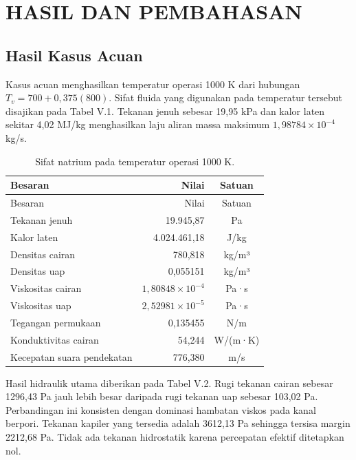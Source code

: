 \documentclass[
  12pt,
  12pt,a4paper,oneside]{report}
\begin{document}
\hypertarget{hasil-dan-pembahasan}{%
\chapter{HASIL DAN PEMBAHASAN}\label{hasil-dan-pembahasan}}

\hypertarget{hasil-kasus-acuan}{%
\section{Hasil Kasus Acuan}\label{hasil-kasus-acuan}}

Kasus acuan menghasilkan temperatur operasi 1000 K dari hubungan
\(T_v=700+0{,}375(800)\). Sifat fluida yang digunakan pada temperatur
tersebut disajikan pada Tabel V.1. Tekanan jenuh sebesar 19,95 kPa dan
kalor laten sekitar 4,02 MJ/kg menghasilkan laju aliran massa maksimum
\(1{,}98784\times10^{-4}\) kg/s.

\begin{longtable}[]{@{}lrc@{}}
\caption{Sifat natrium pada temperatur operasi 1000 K.}\tabularnewline
\toprule
Besaran & Nilai & Satuan \\
\midrule
\endfirsthead
\toprule
Besaran & Nilai & Satuan \\
\midrule
\endhead
Tekanan jenuh & 19.945,87 & Pa \\
Kalor laten & 4.024.461,18 & J/kg \\
Densitas cairan & 780,818 & kg/m³ \\
Densitas uap & 0,055151 & kg/m³ \\
Viskositas cairan & \(1{,}80848\times10^{-4}\) & Pa·s \\
Viskositas uap & \(2{,}52981\times10^{-5}\) & Pa·s \\
Tegangan permukaan & 0,135455 & N/m \\
Konduktivitas cairan & 54,244 & W/(m·K) \\
Kecepatan suara pendekatan & 776,380 & m/s \\
\bottomrule
\end{longtable}

Hasil hidraulik utama diberikan pada Tabel V.2. Rugi tekanan cairan
sebesar 1296,43 Pa jauh lebih besar daripada rugi tekanan uap sebesar
103,02 Pa. Perbandingan ini konsisten dengan dominasi hambatan viskos
pada kanal berpori. Tekanan kapiler yang tersedia adalah 3612,13 Pa
sehingga tersisa margin 2212,68 Pa. Tidak ada tekanan hidrostatik karena
percepatan efektif ditetapkan nol.
\end{document}
